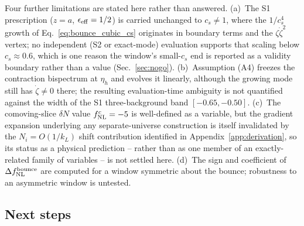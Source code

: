 \documentclass[aps,prd,twocolumn,superscriptaddress,nofootinbib,longbibliography]{revtex4-2}
\newcommand{\fnl}{f_{\rm NL}}
\begin{document}
Four further limitations are stated here rather than answered. (a)~The S1
prescription ($z=a$, $\epsilon_{\rm eff}=1/2$) is carried unchanged to
$c_s\ne1$, where the $1/c_s^4$ growth of Eq.~\eqref{eq:bounce_cubic_cs}
originates in boundary terms and the $\zeta\dot\zeta^2$ vertex; no
independent (S2 or exact-mode) evaluation supports that scaling below
$c_s\approx0.6$, which is one reason the window's small-$c_s$ end is
reported as a validity boundary rather than a value
(Sec.~\ref{sec:nogo}). (b)~Assumption (A4) freezes the contraction
bispectrum at $\eta_h$ and evolves it linearly, although the growing mode
still has $\dot\zeta\ne0$ there; the resulting evaluation-time ambiguity
is not quantified against the width of the S1 three-background band
$[-0.65,-0.50]$. (c)~The comoving-slice $\delta N$ value $f^c_{\rm NL}=-5$
is well-defined as a variable, but the gradient expansion underlying any
separate-universe construction is itself invalidated by the
$N_i=O(1/k_L)$ shift contribution identified in
Appendix~\ref{app:derivation}, so its status as a physical prediction --
rather than as one member of an exactly-related family of variables -- is
not settled here. (d)~The sign and coefficient of
$\Delta\fnl^{\rm bounce}$ are computed for a window symmetric about the
bounce; robustness to an asymmetric window is untested.

\subsection{Next steps}
\label{sec:next}
\end{document}
